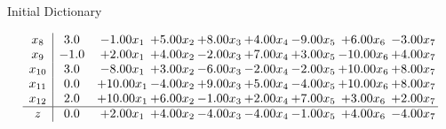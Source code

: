 \documentclass[8pt]{article}
\begin{document}
Initial Dictionary 

\[\begin{array}{c| c c@{\hskip 2pt} c@{\hskip 2pt} c@{\hskip 2pt} c@{\hskip 2pt} c@{\hskip 2pt} c@{\hskip 2pt} c@{\hskip 2pt} }
 x_{8}   &  3.0 & -1.00 x_{1} & +  5.00 x_{2} & +  8.00 x_{3} & +  4.00 x_{4} & -9.00 x_{5} & +  6.00 x_{6} & -3.00 x_{7}\\
 x_{9}   &  -1.0 & +  2.00 x_{1} & +  4.00 x_{2} & -2.00 x_{3} & +  7.00 x_{4} & +  3.00 x_{5} & -10.00 x_{6} & +  4.00 x_{7}\\
 x_{10}   &  3.0 & -8.00 x_{1} & +  3.00 x_{2} & -6.00 x_{3} & -2.00 x_{4} & -2.00 x_{5} & + 10.00 x_{6} & +  8.00 x_{7}\\
 x_{11}   &  0.0 & + 10.00 x_{1} & -4.00 x_{2} & +  9.00 x_{3} & +  5.00 x_{4} & -4.00 x_{5} & + 10.00 x_{6} & +  8.00 x_{7}\\
 x_{12}   &  2.0 & + 10.00 x_{1} & +  6.00 x_{2} & -1.00 x_{3} & +  2.00 x_{4} & +  7.00 x_{5} & +  3.00 x_{6} & +  2.00 x_{7}\\
\hline
z    &  0.0 & +  2.00 x_{1} & +  4.00 x_{2} & -4.00 x_{3} & -4.00 x_{4} & -1.00 x_{5} & +  4.00 x_{6} & -4.00 x_{7}\\
\end{array}\]
\end{document}
